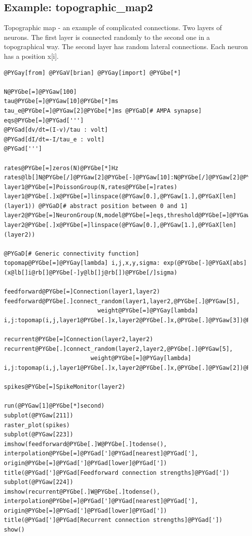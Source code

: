 \documentclass[letterpaper,10pt]{manual}
\begin{document}
\resetcurrentobjects
{}

\hypertarget{index-58}{}\subsection{Example: topographic\_map2}

Topographic map - an example of complicated connections.
Two layers of neurons.
The first layer is connected randomly to the second one in a
topographical way.
The second layer has random lateral connections.
Each neuron has a position x{[}i{]}.

\begin{Verbatim}[commandchars=@\[\]]
@PYGay[from] @PYGaV[brian] @PYGay[import] @PYGbe[*]

N@PYGbe[=]@PYGaw[100]
tau@PYGbe[=]@PYGaw[10]@PYGbe[*]ms
tau_e@PYGbe[=]@PYGaw[2]@PYGbe[*]ms @PYGaD[# AMPA synapse]
eqs@PYGbe[=]@PYGad[''']
@PYGad[dv/dt=(I-v)/tau : volt]
@PYGad[dI/dt=-I/tau_e : volt]
@PYGad[''']

rates@PYGbe[=]zeros(N)@PYGbe[*]Hz
rates@lb[]N@PYGbe[/]@PYGaw[2]@PYGbe[-]@PYGaw[10]:N@PYGbe[/]@PYGaw[2]@PYGbe[+]@PYGaw[10]@rb[]@PYGbe[=]ones(@PYGaw[20])@PYGbe[*]@PYGaw[30]@PYGbe[*]Hz
layer1@PYGbe[=]PoissonGroup(N,rates@PYGbe[=]rates)
layer1@PYGbe[.]x@PYGbe[=]linspace(@PYGaw[0.],@PYGaw[1.],@PYGaX[len](layer1)) @PYGaD[# abstract position between 0 and 1]
layer2@PYGbe[=]NeuronGroup(N,model@PYGbe[=]eqs,threshold@PYGbe[=]@PYGaw[10]@PYGbe[*]mV,reset@PYGbe[=]@PYGaw[0]@PYGbe[*]mV)
layer2@PYGbe[.]x@PYGbe[=]linspace(@PYGaw[0.],@PYGaw[1.],@PYGaX[len](layer2))

@PYGaD[# Generic connectivity function]
topomap@PYGbe[=]@PYGay[lambda] i,j,x,y,sigma: exp(@PYGbe[-]@PYGaX[abs](x@lb[]i@rb[]@PYGbe[-]y@lb[]j@rb[])@PYGbe[/]sigma)

feedforward@PYGbe[=]Connection(layer1,layer2)
feedforward@PYGbe[.]connect_random(layer1,layer2,@PYGbe[.]@PYGaw[5],
                           weight@PYGbe[=]@PYGay[lambda] i,j:topomap(i,j,layer1@PYGbe[.]x,layer2@PYGbe[.]x,@PYGbe[.]@PYGaw[3])@PYGbe[*]@PYGaw[3]@PYGbe[*]mV)

recurrent@PYGbe[=]Connection(layer2,layer2)
recurrent@PYGbe[.]connect_random(layer2,layer2,@PYGbe[.]@PYGaw[5],
                         weight@PYGbe[=]@PYGay[lambda] i,j:topomap(i,j,layer1@PYGbe[.]x,layer2@PYGbe[.]x,@PYGbe[.]@PYGaw[2])@PYGbe[*]@PYGbe[.]@PYGaw[5]@PYGbe[*]mV)

spikes@PYGbe[=]SpikeMonitor(layer2)

run(@PYGaw[1]@PYGbe[*]second)
subplot(@PYGaw[211])
raster_plot(spikes)
subplot(@PYGaw[223])
imshow(feedforward@PYGbe[.]W@PYGbe[.]todense(), interpolation@PYGbe[=]@PYGad[']@PYGad[nearest]@PYGad['], origin@PYGbe[=]@PYGad[']@PYGad[lower]@PYGad['])
title(@PYGad[']@PYGad[Feedforward connection strengths]@PYGad['])
subplot(@PYGaw[224])
imshow(recurrent@PYGbe[.]W@PYGbe[.]todense(), interpolation@PYGbe[=]@PYGad[']@PYGad[nearest]@PYGad['], origin@PYGbe[=]@PYGad[']@PYGad[lower]@PYGad['])
title(@PYGad[']@PYGad[Recurrent connection strengths]@PYGad['])
show()
\end{Verbatim}
\end{document}
